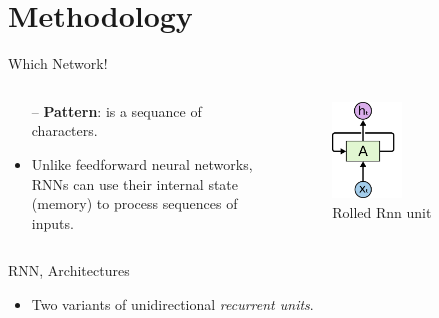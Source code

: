 \documentclass[10pt]{beamer}
\begin{document}
\section{Methodology}
\begin{frame}[fragile]{Which Network!}


\begin{columns}


\begin{column}{0.7\textwidth}
\begin{itemize}
    \item[--] \textbf{Pattern}: is a sequance of characters.
    \item  Unlike feedforward neural networks, RNNs can use their internal state (memory) to process sequences of inputs.
\end{itemize}

\end{column}



\begin{column}{0.5\textwidth}  %
    \begin{figure}
        \begin{center}
         \includegraphics[width=0.5\textwidth]{rolledRNN.png}
         \caption{Rolled Rnn unit}
         \end{center}
    \end{figure}
\end{column}
\end{columns}
\end{frame}



\begin{frame}[fragile]{RNN, Architectures}

\begin{center}
    
\end{center}
\begin{itemize}
    \item Two variants of unidirectional \textit{recurrent units}.
\end{itemize}
\end{frame}
\end{document}
